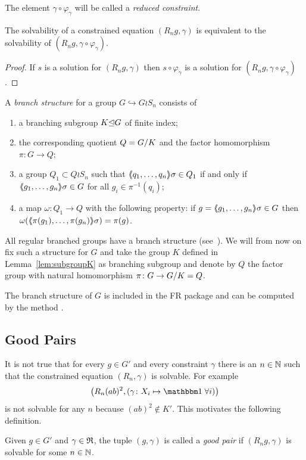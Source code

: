 \documentclass[a4paper,11pt]{amsart}
\begin{document}
 The element $\gamma \circ \varphi_\gamma$ will be called a \emph{reduced constraint}.

\begin{lem} \label{lem:solvabilityWithReducedConstraint}
 The solvability of a constrained equation $(R_n g,\gamma)$ is equivalent to the 
 solvability of $(R_n g,\gamma\circ \varphi_\gamma)$.
\end{lem}
 \begin{proof}
 If $s$ is a solution for $(R_n g,\gamma)$ then $s\circ \varphi_\gamma$ is
 a solution for $(R_n g,\gamma\circ \varphi_\gamma)$. 
\end{proof}


\begin{defi} 
A \emph{branch structure} for a group $G\hookrightarrow G \wr S_n$ consists of  
\begin{enumerate}
 \item a branching subgroup $K{\mathrel\trianglelefteq} G$ of finite index;
 \item the corresponding quotient $Q={G/K}$ and the factor homomorphism $\pi\colon G \to Q$;
 \item a group $Q_1 \subset Q \wr S_n$ such that $\langle\negthickspace\langle q_1,\ldots,q_n\rangle\negthickspace\rangle\sigma\in Q_1$ if
  and only if $\langle\negthickspace\langle g_1,\ldots,g_n\rangle\negthickspace\rangle\sigma \in G$ for all $g_i \in \pi^{-1}(q_i)$;
 \item a map $\omega\colon Q_1 \to Q$ with the following property: if 
      $g=\langle\negthickspace\langle g_1,\ldots,g_n\rangle\negthickspace\rangle\sigma \in G$ then $\omega(\langle\negthickspace\langle\pi(g_1),\ldots,\pi(g_n)\rangle\negthickspace\rangle\sigma) = \pi(g)$.
\end{enumerate}
\end{defi}
All regular branched groups have a branch structure
(see~{\cite[Remark after Definition~5.1]{Bartholdi:RepresentationZetaFunctions}}).
We will from now on fix such a structure for $G$ and take 
the group $K$ defined in Lemma~\ref{lem:subgroupK} as branching subgroup and 
denote by $Q$ the factor group with natural homomorphism $\pi\colon G \to {G/K}=Q$.

\begin{re}
  The branch structure of $G$ is included in the FR package and can be
  computed by the method .
\end{re}

\subsection{Good Pairs}\label{sec:good_pairs}
It is not true that for every $g\in G'$ and every constraint $\gamma$
there is an $n\in\mathbb{N}$ such that the constrained equation
$(R_n,\gamma)$ is solvable. For example
\[\left(R_n(ab)^2,(\gamma\colon X_i\mapsto\id\;\forall i)\right)\] 
is not solvable for any $n$ because $(ab)^2\notin K'$.  This motivates
the following definition.
\begin{defi}
Given $g\in G'$ and $\gamma\in\mathfrak{R}$, the tuple $(g,\gamma)$ is called a \emph{good pair} if 
$(R_ng,\gamma)$ is solvable for some $n\in\mathbb{N}$.  
\end{defi}
\end{document}

